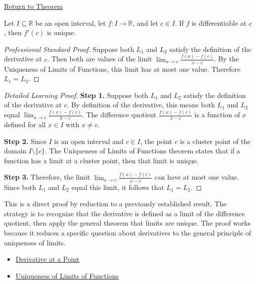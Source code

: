 \newpage
{}
\label{prf:uniqueness-of-derivative}

\begin{remark*}[Return]
\hyperref[thm:uniqueness-of-the-derivative]{Return to Theorem}
\end{remark*}

\begin{theorem*}
Let $I \subseteq \mathbb{R}$ be an open interval, let $f : I \to \mathbb{R}$, and let $c \in I$. If $f$ is differentiable at $c$, then $f'(c)$ is unique.
\end{theorem*}

\begin{proof}[Professional Standard Proof]
\LRAProofBodyStart
Suppose both $L_1$ and $L_2$ satisfy the definition of the derivative at $c$. Then both are values of the limit $\lim_{x \to c} \frac{f(x)-f(c)}{x-c}$. By the Uniqueness of Limits of Functions, this limit has at most one value. Therefore $L_1 = L_2$.
\end{proof}

\begin{proof}[Detailed Learning Proof]
\LRAProofBodyStart

\textbf{Step 1.} Suppose both $L_1$ and $L_2$ satisfy the definition of the derivative at $c$. By definition of the derivative, this means both $L_1$ and $L_2$ equal $\lim_{x \to c} \frac{f(x)-f(c)}{x-c}$. The difference quotient $\frac{f(x)-f(c)}{x-c}$ is a function of $x$ defined for all $x \in I$ with $x \neq c$.

\textbf{Step 2.} Since $I$ is an open interval and $c \in I$, the point $c$ is a cluster point of the domain $I \setminus \{c\}$. The Uniqueness of Limits of Functions theorem states that if a function has a limit at a cluster point, then that limit is unique.

\textbf{Step 3.} Therefore, the limit $\lim_{x \to c} \frac{f(x)-f(c)}{x-c}$ can have at most one value. Since both $L_1$ and $L_2$ equal this limit, it follows that $L_1 = L_2$.
\end{proof}

\begin{remark*}
This is a direct proof by reduction to a previously established result. The strategy is to recognize that the derivative is defined as a limit of the difference quotient, then apply the general theorem that limits are unique. The proof works because it reduces a specific question about derivatives to the general principle of uniqueness of limits.
\end{remark*}

\begin{dependencies}
\begin{itemize}
  \item \hyperref[def:derivative-at-a-point]{Derivative at a Point}
  \item \hyperref[thm:limit-unique]{Uniqueness of Limits of Functions}
\end{itemize}
\end{dependencies}

\clearpage
